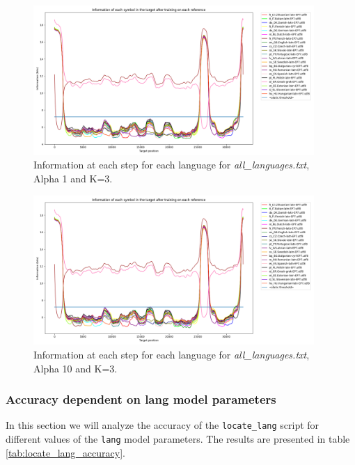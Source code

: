\documentclass{article}
\begin{document}
\begin{figure}
    \centering
    \includegraphics[width=0.95\textwidth]{../results/all_languages/-k_3_-a_1.png}
    \caption{Information at each step for each language for \textit{all\_languages.txt}, Alpha 1 and K=3.}
    \label{fig:all_languages_a1}
\end{figure}

\begin{figure}
    \centering
    \includegraphics[width=0.95\textwidth]{../results/all_languages/-k_3_-a_10.png}
    \caption{Information at each step for each language for \textit{all\_languages.txt}, Alpha 10 and K=3.}
    \label{fig:all_languages_a10}
\end{figure}

\subsubsection{Accuracy dependent on lang model parameters}
\label{subsubsec:results_locate_lang_accuracy}

In this section we will analyze the accuracy of the \texttt{locate\_lang} script for different values of the \texttt{lang} model parameters.
The results are presented in table \ref{tab:locate_lang_accuracy}.
\end{document}
